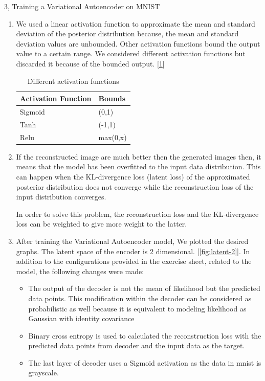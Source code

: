 \documentclass[10pt,a4paper]{article}
\begin{document}
\begin{task}{3, Training a Variational Autoencoder on MNIST}
\begin{enumerate}
	\item We used a linear activation function to approximate the mean and standard deviation of the posterior distribution because, the mean and standard deviation values are unbounded. Other activation functions bound the output value to a certain range. We considered different activation functions but discarded it because of the bounded output. [\ref{tab:activation}]
\begin {table}[H]
\caption {Different activation functions} \label{tab:activation} 
\begin{center}
\begin{tabular}{ | m{10em} | m{10em}| } 
\hline
Activation Function& Bounds \\ 
\hline \hline
Sigmoid & (0,1) \\ 
\hline
Tanh & (-1,1) \\
\hline
Relu & max(0,x) \\
\hline
\end{tabular}
\end{center}
\end{table}
	\item If the reconstructed image are much better then the generated images then, it means that the model has been overfitted to the input data distribution. This can happen when the KL-divergence loss (latent loss) of the approximated posterior distribution does not converge while the reconstruction loss of the input distribution converges. 
	
	In order to solve this problem, the reconstruction loss and the KL-divergence loss can be weighted to give more weight to the latter.
	
	\item After training the Variational Autoencoder model, We plotted the desired graphs. The latent space of the encoder is 2 dimensional. [\ref{fig:latent-2}]. In addition to the configurations provided in the exercise sheet, related to the model, the following changes were made:
	\begin{itemize}
		\item The output of the decoder is not the mean of likelihood but the predicted data points. This modification within the decoder can be considered as probabilistic as well because it is equivalent to modeling likelihood as Gaussian with identity covariance
		\item Binary cross entropy is used to calculated the reconstruction loss with the predicted data points from decoder and the input data as the target.
		\item The last layer of decoder uses a Sigmoid activation as the data in mnist is grayscale. 
	\end{itemize}
	

\end{enumerate}
\end{task}
\end{document}
